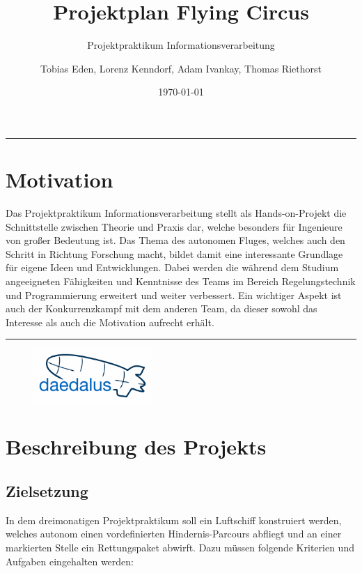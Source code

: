 \documentclass[lang=ngerman,inputenc=utf8,fontsize=10pt]{ldvarticle}
\title{Projektplan Flying Circus}
\subtitle{Projektpraktikum Informationsverarbeitung}
\author{Tobias Eden, Lorenz Kenndorf, Adam Ivankay, Thomas Riethorst}
\date{\today}
\begin{document}
	\maketitle	
	\thispagestyle{empty}

\hrule

\section*{Motivation}

Das Projektpraktikum Informationsverarbeitung stellt als Hands-on-Projekt die Schnittstelle zwischen Theorie und Praxis dar, welche besonders für Ingenieure von großer Bedeutung ist.
Das Thema des autonomen Fluges, welches auch den Schritt in Richtung Forschung macht, bildet damit eine interessante Grundlage für eigene Ideen und Entwicklungen. 
Dabei werden die während dem Studium angeeigneten Fähigkeiten und Kenntnisse des Teams im Bereich Regelungstechnik und Programmierung erweitert und weiter verbessert. 
Ein wichtiger Aspekt ist auch der  Konkurrenzkampf mit dem anderen Team, da dieser sowohl das Interesse als auch die Motivation aufrecht erhält.   




\vspace*{1cm}
\hrule


\begin{figure}[!b]
\centering
\includegraphics[width=0.4\textwidth]{logo_kl.png}
\end{figure}

\newpage


\section{Beschreibung des Projekts}

\subsection*{Zielsetzung}
In dem dreimonatigen Projektpraktikum soll ein Luftschiff konstruiert werden, welches autonom einen vordefinierten Hindernis-Parcours abfliegt und an einer markierten Stelle ein Rettungspaket abwirft. Dazu müssen folgende Kriterien und Aufgaben eingehalten werden:
\end{document}
